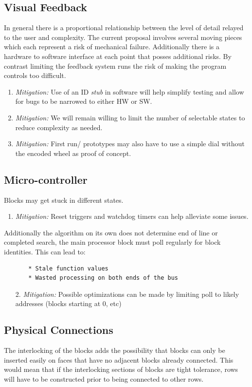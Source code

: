    \subsection{Visual Feedback}
   In general there is a proportional relationship between the level of detail relayed to the user and complexity. The current proposal involves several moving pieces which each represent a risk of mechanical failure. Additionally there is a hardware to software interface at each point that posses additional risks. By contrast limiting the feedback system runs the risk of making the program controls too difficult.  
  \begin{enumerate}
    \item \textit{Mitigation:} Use of an ID \textit{ stub} in software will help simplify testing and allow for bugs to be narrowed to either HW or SW.
      \item \textit{Mitigation:} We will remain willing to limit the number of selectable states to reduce complexity as needed.
        \item \textit{Mitigation:} First run/ prototypes may also have to use a simple dial without the encoded wheel as proof of concept.
  \end{enumerate} 
  \vfill
   \subsection{Micro-controller}
   
   Blocks may get stuck in different states. 
   \begin{enumerate}
     \item \textit{Mitigation:} Reset triggers and watchdog timers can help alleviate some issues.
   \end{enumerate} 
   Additionally the algorithm on its own does not determine end of line or completed search, the main processor block must poll regularly for block identities. This can lead to:
      \begin{verbatim}
       * Stale function values
       * Wasted processing on both ends of the bus
      \end{verbatim}
     \begin{enumerate}
      \item[2.] \textit{Mitigation:} Possible optimizations can be made by limiting poll to likely addresses (blocks starting at 0, etc)
     \end{enumerate}
  
    \subsection{Physical Connections}
    The interlocking of the blocks adds the possibility that blocks can only be inserted easily on faces that have no adjacent blocks already connected. This would mean that if the interlocking sections of blocks are tight tolerance, rows will have to be constructed prior to being connected to other rows.
    
